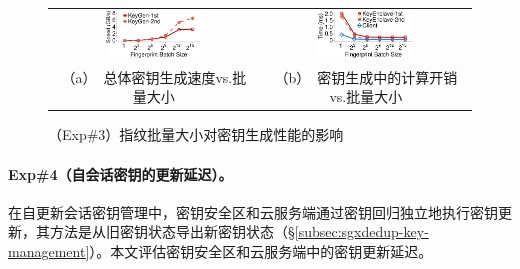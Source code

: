 \begin{figure}[!htb]
\centering
\begin{tabular}{@{\ }c@{\ }c}
\includegraphics[width=0.48\textwidth]{pic/sgxdedup/expa2_keyEnclaveBatchSize_Performance_overall.pdf}                                         &
\includegraphics[width=0.48\textwidth]{pic/sgxdedup/expa2_keyEnclaveBatchSize_Performance_1st.pdf}                                               \\
\mbox{\parbox{0.48\textwidth}{\small （a） 总体密钥生成速度vs.批量大小}} &
\mbox{\parbox{0.48\textwidth}{\small （b） 密钥生成中的计算开销vs.批量大小}}
\end{tabular}
\caption{（Exp\#3）指纹批量大小对密钥生成性能的影响}
\label{fig:sgxdedup-exp-keygen-breakdown}
\end{figure}


\paragraph*{Exp\#4（自会话密钥的更新延迟）。}在自更新会话密钥管理中，密钥安全区和云服务端通过密钥回归独立地执行密钥更新，其方法是从旧密钥状态导出新密钥状态（\S\ref{subsec:sgxdedup-key-management}）。本文评估密钥安全区和云服务端中的密钥更新延迟。

